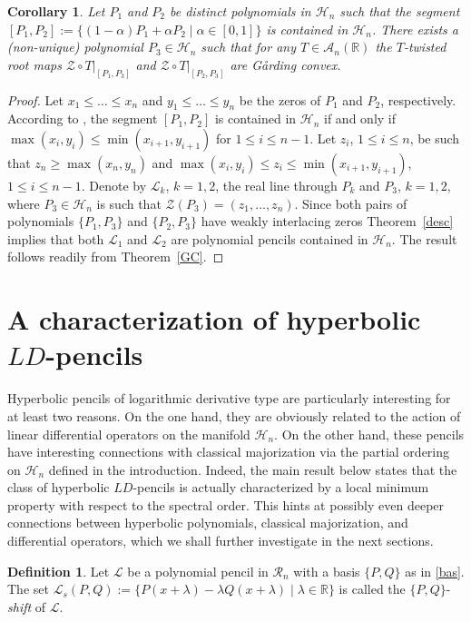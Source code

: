 \documentclass[10pt,twoside,a4paper,reqno]{amsart}
\theoremstyle{plain}
\newtheorem{coro+}           {Corollary}
\theoremstyle{definition}
\newtheorem{defi+}           {Definition}
\theoremstyle{remark}
\newenvironment{corollary}{\begin{coro+}}{\end{coro+}}
\newenvironment{definition}{\begin{defi+}}{\end{defi+}}
\newcommand {\bR} {\mathbb {R}}
\newcommand {\al} {\alpha}
\newcommand {\la} {\lambda}
\newcommand {\calL} {\mathcal {L}}
\newcommand {\calH} {\mathcal {H}}
\newcommand {\calR} {\mathcal {R}}
\newcommand {\calA} {\mathcal {A}}
\newcommand {\calZ} {\mathcal {Z}}
\begin{document}
\begin{corollary}\label{segm}
Let $P_1$ and $P_2$ be distinct polynomials in $\calH_n$ such that the segment 
$[P_1,P_2]:=\{(1-\al)P_1+\al P_2\mid \al\in [0,1]\}$ is contained in 
$\calH_n$. There 
exists a (non-unique) polynomial $P_3\in \calH_n$ such that for any 
$T\in \calA_n(\bR)$ the $T$-twisted root maps $\calZ\circ T|_{[P_1,P_3]}$ and 
$\calZ\circ T|_{[P_2,P_3]}$ are G\aa rding convex.
\end{corollary}

\begin{proof}
Let $x_1\le\ldots\le x_n$ and $y_1\le\ldots \le y_n$ be the zeros of $P_1$ 
and $P_2$, respectively. According to \cite[Theorem 2.1]{D}, the segment 
$[P_1,P_2]$ is contained in $\calH_n$ if and only if $\max(x_i,y_i)\le 
\min(x_{i+1},y_{i+1})$ for $1\le i\le n-1$. Let $z_i$, $1\le i\le n$, be such 
that $z_n\ge \max(x_n,y_n)$ and 
$\max(x_i,y_i)\le z_i\le\min(x_{i+1},y_{i+1})$, $1\le i\le n-1$. 
Denote by $\calL_k$, $k=1,2$, the real line through $P_k$ and $P_3$, $k=1,2$,
where $P_3\in \calH_n$ is such that $\calZ(P_3)=(z_1,\ldots,z_n)$. Since both
pairs of polynomials $\{P_1,P_3\}$ and $\{P_2,P_3\}$ have weakly interlacing 
zeros Theorem~\ref{desc} implies that both $\calL_1$ and 
$\calL_2$ are polynomial pencils contained in $\calH_n$. The result follows 
readily from Theorem~\ref{GC}.
\end{proof}

\section{A characterization of hyperbolic $LD$-pencils}

Hyperbolic pencils of logarithmic derivative type are particularly interesting
for at least two reasons. On the one hand, they are obviously related to 
the action of linear differential operators on the manifold $\calH_n$. On 
the other hand, these pencils have interesting connections 
with classical majorization via the partial ordering on $\calH_n$ defined in 
the introduction. Indeed, the main result below states that the 
class of hyperbolic $LD$-pencils is actually characterized by a local minimum 
property with respect to the spectral order. This hints at possibly even 
deeper connections between hyperbolic polynomials, classical majorization, 
and differential operators, which we shall further investigate in the next 
sections. 

\begin{definition}\label{shift}
Let $\calL$ be a polynomial pencil in $\calR_n$ with a basis $\{P,Q\}$ as 
in \eqref{bas}. The set 
$\calL_s(P,Q):=\{P(x+\la)-\la Q(x+\la)\mid\la \in \bR\}$ is called the 
$\{P,Q\}$-{\em shift} of $\calL$.
\end{definition}
\end{document}
